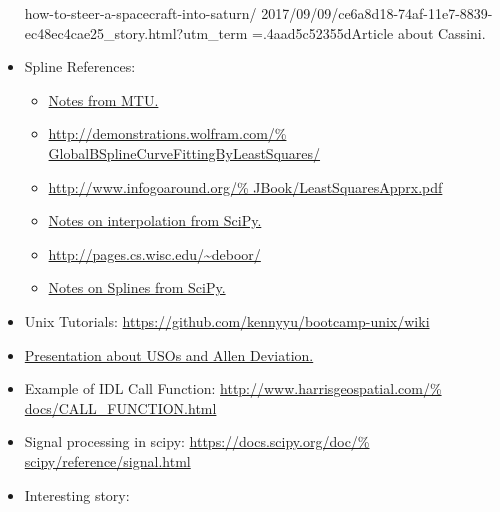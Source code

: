 \documentclass[crop=false,class=article,oneside]{standalone}
\begin{document}
\begin{itemize}
{                            how-to-steer-a-spacecraft-into-saturn/%
                            2017/09/09/ce6a8d18-74af-11e7-8839-%
                            ec48ec4cae25_story.html?utm_term%
                            =.4aad5c52355d}{Article about Cassini.}
                \item Spline References:
                \begin{itemize}
                    \item \href{http://www.cs.mtu.edu/%
                                ~shene/COURSES/cs3621/NOTES/%
                                INT-APP/CURVE-APP-global.html}
                               {Notes from MTU.}
                    \item \url{http://demonstrations.wolfram.com/%
                               GlobalBSplineCurveFittingByLeastSquares/}
                    \item \url{http://www.infogoaround.org/%
                               JBook/LeastSquaresApprx.pdf}
                    \item \href{https://docs.scipy.org/doc/%
                                scipy-0.15.1/reference/generated/%
                                scipy.interpolate.splrep.html}
                               {Notes on interpolation from SciPy.}
                    \item \url{http://pages.cs.wisc.edu/~deboor/}
                    \item \href{https://docs.scipy.org/doc/%
                                scipy/reference/generated/%
                                scipy.interpolate.splrep.html}
                               {Notes on Splines from SciPy.}
                \end{itemize}
                \item Unix Tutorials:
                    \url{https://github.com/kennyyu/bootcamp-unix/wiki}
                \item \href{https://websites.isae-supaero.fr/%
                            IMG/pdf/uso-toulouse.pdf}
                           {Presentation about USOs and Allen Deviation.}
                \item Example of IDL Call Function:
                      \url{http://www.harrisgeospatial.com/%
                           docs/CALL_FUNCTION.html}
                \item Signal processing in scipy:
                      \url{https://docs.scipy.org/doc/%
                           scipy/reference/signal.html}
                \item Interesting story:

\end{itemize}
\end{document}
